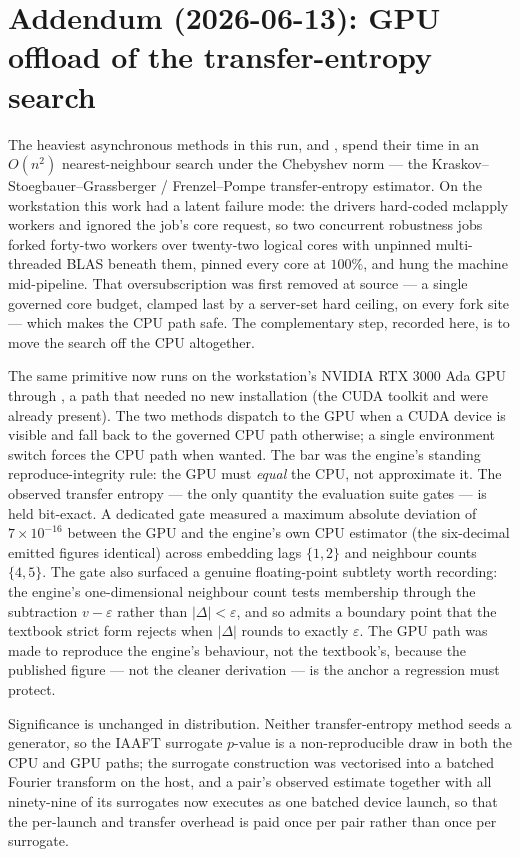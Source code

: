\section*{Addendum (2026-06-13): GPU offload of the transfer-entropy search}
\label{sec:gpu}
The heaviest asynchronous methods in this run,  and
, spend their time in an $O(n^2)$ nearest-neighbour
search under the Chebyshev norm --- the Kraskov--Stoegbauer--Grassberger /
Frenzel--Pompe transfer-entropy estimator. On the workstation this work had a
latent failure mode: the drivers hard-coded  mclapply
workers and ignored the job's core request, so two concurrent robustness jobs
forked forty-two workers over twenty-two logical cores with unpinned
multi-threaded BLAS beneath them, pinned every core at $100\%$, and hung the
machine mid-pipeline. That oversubscription was first removed at source --- a
single governed core budget, clamped last by a server-set hard ceiling, on
every fork site --- which makes the CPU path safe. The complementary step,
recorded here, is to move the search off the CPU altogether.

The same primitive now runs on the workstation's NVIDIA RTX 3000 Ada GPU
through , a path that needed no new installation (the CUDA
toolkit and  were already present). The two methods dispatch to
the GPU when a CUDA device is visible and fall back to the governed CPU path
otherwise; a single environment switch forces the CPU path when wanted. The
bar was the engine's standing reproduce-integrity rule: the GPU must
\emph{equal} the CPU, not approximate it. The observed transfer entropy --- the
only quantity the evaluation suite gates --- is held bit-exact. A dedicated
gate measured a maximum absolute deviation of $7\times10^{-16}$ between the GPU
and the engine's own CPU estimator (the six-decimal emitted figures identical)
across embedding lags $\{1,2\}$ and neighbour counts $\{4,5\}$. The gate also
surfaced a genuine floating-point subtlety worth recording: the engine's
one-dimensional neighbour count tests membership through the subtraction
$v-\varepsilon$ rather than $|\Delta|<\varepsilon$, and so admits a boundary
point that the textbook strict form rejects when $|\Delta|$ rounds to exactly
$\varepsilon$. The GPU path was made to reproduce the engine's behaviour, not
the textbook's, because the published figure --- not the cleaner derivation ---
is the anchor a regression must protect.

Significance is unchanged in distribution. Neither transfer-entropy method
seeds a generator, so the IAAFT surrogate $p$-value is a non-reproducible draw
in both the CPU and GPU paths; the surrogate construction was vectorised into a
batched Fourier transform on the host, and a pair's observed estimate together
with all ninety-nine of its surrogates now executes as one batched device
launch, so that the per-launch and transfer overhead is paid once per pair
rather than once per surrogate.

